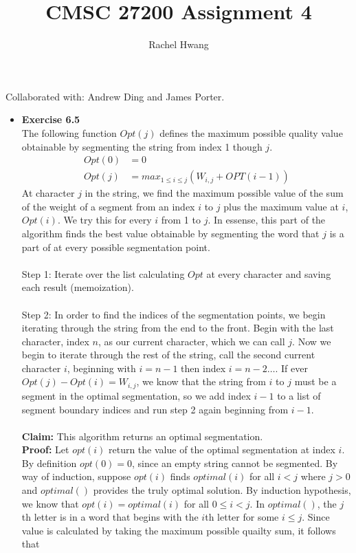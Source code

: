 \documentclass[a4paper]{article}
\title{CMSC 27200 Assignment 4}
\author{Rachel Hwang}
\begin{document}
\maketitle

Collaborated with: Andrew Ding and James Porter.
\begin{itemize}

\item{\textbf{Exercise 6.5}} \\
The following function $Opt(j)$ defines the maximum possible quality value obtainable by segmenting the string from index 1 though $j$.
\begin{align*}
Opt(0) &= 0 \\
Opt(j) &= max_{1 \leq i \leq j} (W_{i,j} + OPT(i-1))
\end{align*}
At character $j$ in the string, we find the maximum possible value of the sum of the weight of a segment from an index $i$ to $j$ plus the maximum value at $i$, $Opt(i)$. We try this for every $i$ from 1 to $j$. In essense, this part of the algorithm finds the best value obtainable by segmenting the word that $j$ is a part of at every possible segmentation point. \\
\\
Step 1: Iterate over the list calculating $Opt$ at every character and saving each result (memoization). \\
\\
Step 2: In order to find the indices of the segmentation points, we begin iterating through the string from the end to the front. Begin with the last character, index $n$, as our current character, which we can call $j$. Now we begin to iterate through the rest of the string, call the second current character $i$, beginning with $i = n-1$ then index $i = n-2 \dots$. If ever $Opt(j)-Opt(i) = W_{i,j}$, we know that the string from $i$ to $j$ must be a segment in the optimal segmentation, so we add index $i - 1$ to a list of segment boundary indices and run step 2 again beginning from $i - 1$. \\
\\
\textbf{Claim:} This algorithm returns an optimal segmentation. \\
\textbf{Proof:} Let $opt(i)$ return the value of the optimal segmentation at index $i$. By definition $opt(0) = 0$, since an empty string cannot be segmented. By way of induction, suppose $opt(i)$ finds $optimal(i)$ for all $i <j$ where $j > 0$ and $optimal()$ provides the truly optimal solution. By induction hypothesis, we know that $opt(i) = optimal(i)$ for all $0 \leq i < j$. In $optimal()$, the $j$th letter is in a word that begins with the $i$th letter for some $i \leq j$. Since value is calculated by taking the maximum possible quailty sum, it follows that 

\end{itemize}
\end{document}
